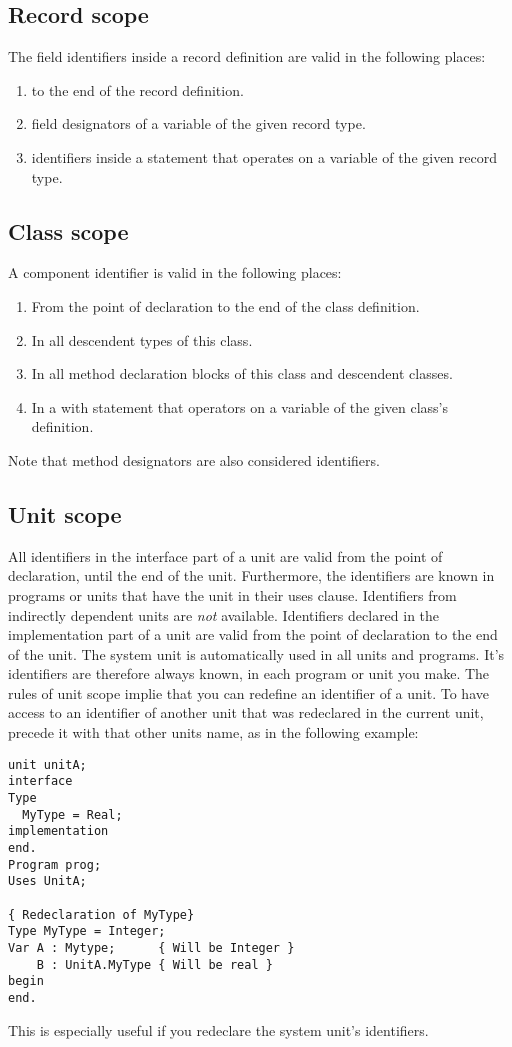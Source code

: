 \documentclass{report}
\begin{document}
\subsection{Record scope}
The field identifiers inside a record definition are valid in the following
places:
\begin{enumerate}
\item to the end of the record definition.
\item field designators of a variable of the given record type.
\item identifiers inside a  statement that operates on a variable
of the given record type.
\end{enumerate}
\subsection{Class scope}
A component identifier is valid in the following places:
\begin{enumerate}
\item From the point of declaration to the end of the class definition.
\item In all descendent types of this class.
\item In all method declaration blocks of this class and descendent classes.
\item In a with statement that operators on a variable of the given class's
definition.
\end{enumerate}
Note that method designators are also considered identifiers.
\subsection{Unit scope}
All identifiers in the interface part of a unit are valid from the point of
declaration, until the end of the unit. Furthermore, the identifiers are
known in programs or units that have the unit in their uses clause.
Identifiers from indirectly dependent units are {\em not} available.
Identifiers declared in the implementation part of a unit are valid from the
point of declaration to the end of the unit.
The system unit is automatically used in all units and programs.
It's identifiers are therefore always known, in each program or unit
you make.
The rules of unit scope implie that you can redefine an identifier of a
unit. To have access to an identifier of another unit that was redeclared in
the current unit, precede it with that other units name, as in the following
example:
\begin{verbatim}
unit unitA;
interface
Type
  MyType = Real;
implementation
end.
Program prog;
Uses UnitA;

{ Redeclaration of MyType}
Type MyType = Integer;
Var A : Mytype;      { Will be Integer }
    B : UnitA.MyType { Will be real }
begin
end.
\end{verbatim}
This is especially useful if you redeclare the system unit's identifiers.
\end{document}
